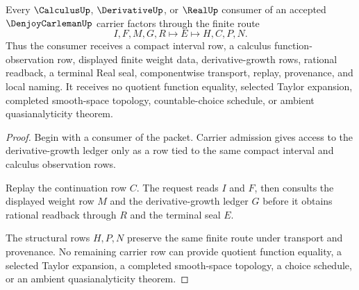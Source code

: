 \begin{theorem}
\label{thm:denjoy-carleman-derivative-growth-route}
Every $\CalculusUp$, $\DerivativeUp$, or $\RealUp$ consumer of an accepted $\DenjoyCarlemanUp$ carrier factors through the finite route
$$
I,F,M,G,R \longmapsto E \longmapsto H,C,P,N .
$$
Thus the consumer receives a compact interval row, a calculus function-observation row, displayed finite weight data, derivative-growth rows, rational readback, a terminal Real seal, componentwise transport, replay, provenance, and local naming. It receives no quotient function equality, selected Taylor expansion, completed smooth-space topology, countable-choice schedule, or ambient quasianalyticity theorem.
\end{theorem}
\begin{proof}
Begin with a consumer of the packet. Carrier admission gives access to the derivative-growth ledger only as a row tied to the same compact interval and calculus observation rows.

Replay the continuation row $C$. The request reads $I$ and $F$, then consults the displayed weight row $M$ and the derivative-growth ledger $G$ before it obtains rational readback through $R$ and the terminal seal $E$.

The structural rows $H,P,N$ preserve the same finite route under transport and provenance. No remaining carrier row can provide quotient function equality, a selected Taylor expansion, a completed smooth-space topology, a choice schedule, or an ambient quasianalyticity theorem.
\end{proof}




